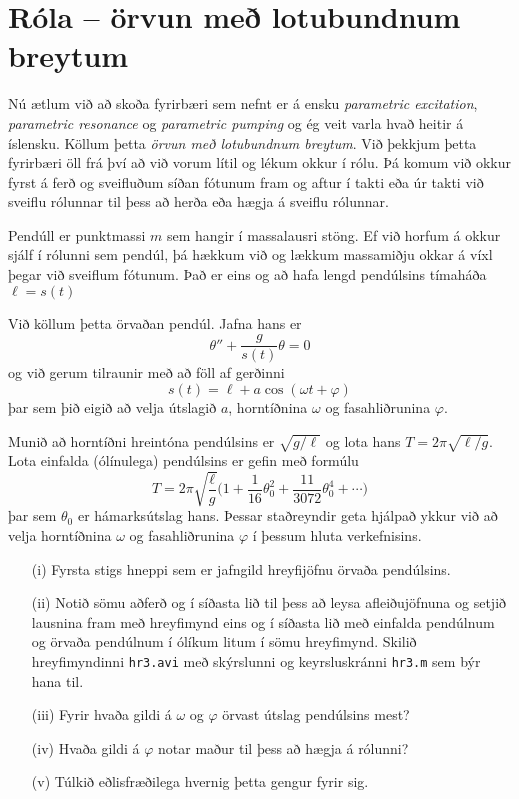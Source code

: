 \documentclass[11pt,icelandic]{article}
\begin{document}
\section{Róla --  örvun með lotubundnum breytum}

Nú ætlum við að skoða fyrirbæri sem 
nefnt er á ensku  {\it parametric excitation}, {\it parametric
  resonance} og  {\it parametric pumping} og ég veit varla hvað heitir
á íslensku.  Köllum þetta {\it örvun með lotubundnum breytum}.  
Við þekkjum þetta fyrirbæri öll frá því að við vorum lítil og lékum okkur í
rólu. Þá komum við okkur fyrst á ferð og sveifluðum síðan fótunum
fram og aftur í takti eða úr takti við sveiflu rólunnar til þess að 
herða eða hægja á sveiflu rólunnar. 

\smallskip
Pendúll er punktmassi $m$ sem hangir í massalausri stöng.   Ef við
horfum á okkur sjálf í rólunni sem pendúl, þá hækkum við  og
lækkum  massamiðju okkar á víxl þegar við sveiflum fótunum.  
Það er eins og að hafa lengd pendúlsins tímaháða
$\ell=s(t)$

\smallskip
Við köllum þetta örvaðan pendúl.  Jafna hans er
$$
\theta''+\dfrac g{s(t)}\theta=0
$$
og við gerum tilraunir með að föll af gerðinni
$$
s(t)=\ell+a\cos(\omega t+\varphi)
$$
þar sem þið eigið að velja útslagið $a$, horntíðnina 
$\omega$ og fasahliðrunina $\varphi$.  

\smallskip
Munið að horntíðni hreintóna pendúlsins er $\sqrt{g/\ell}$ og 
lota hans  $T=2\pi\sqrt{\ell/g}$.   
Lota einfalda (ólínulega) pendúlsins er gefin með formúlu
$$
T=2\pi \sqrt{\dfrac \ell g}\bigg(
1+\dfrac 1{16} \theta_0^2+\dfrac{11}{3072} \theta_0^4+\cdots\bigg)
$$
þar sem $\theta_0$ er hámarksútslag hans.  Þessar staðreyndir
geta hjálpað ykkur við að velja horntíðnina $\omega$ og fasahliðrunina
$\varphi$ í þessum hluta verkefnisins. 


\begin{enumerate}
\item[(i)]  Fyrsta stigs hneppi sem er jafngild 
hreyfijöfnu örvaða pendúlsins.
\item[(ii)] 
Notið sömu aðferð og í síðasta lið til þess að
leysa afleiðujöfnuna og  
setjið lausnina fram með hreyfimynd eins og 
í síðasta lið með einfalda pendúlnum og örvaða pendúlnum í ólíkum
litum í sömu hreyfimynd. Skilið hreyfimyndinni {\tt hr3.avi} með
skýrslunni og keyrsluskránni {\tt hr3.m} sem býr hana til.
\item[(iii)] Fyrir hvaða gildi á  $\omega$ og $\varphi$ 
örvast útslag pendúlsins mest?
\item[(iv)] Hvaða gildi á $\varphi$ notar maður til þess að hægja á
  rólunni?
\item[(v)] Túlkið eðlisfræðilega hvernig þetta gengur fyrir sig.
\end{enumerate}
\end{document}
